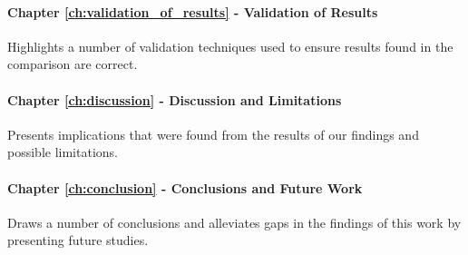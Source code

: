 \paragraph{Chapter \ref{ch:validation_of_results} - Validation of Results} Highlights a number of validation techniques used to ensure results found in the comparison are correct.

\paragraph{Chapter \ref{ch:discussion} - Discussion and Limitations}Presents implications that were found from the results of our findings and possible limitations.

\paragraph{Chapter \ref{ch:conclusion} - Conclusions and Future Work} Draws a number of conclusions and alleviates gaps in the findings of this work by presenting future studies.